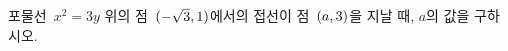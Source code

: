 포물선~$x^2=3y$ 위의 점~$(-\sqrt{3}{,}\mkern3mu\mathopen{}1)$에서의 접선이 점~$(a{,}\mkern3mu\mathopen{}3)$을 지날 때, $a$의 값을 구하시오.
